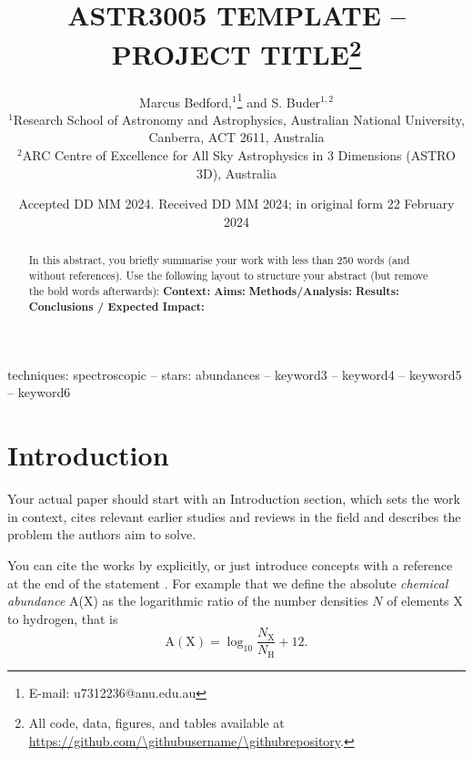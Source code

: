 \documentclass[fleqn,usenatbib]{mnras}
\title[Short title, max. 45 characters]{ASTR3005 TEMPLATE -- PROJECT TITLE\thanks{All code, data, figures, and tables available at \url{https://github.com/\githubusername/\githubrepository}.}}
\author[M. Bedford et al.]{
Marcus Bedford,$^{1}$\thanks{E-mail: u7312236@anu.edu.au}
and S. Buder$^{1,2}$
\\
$^{1}$Research School of Astronomy and Astrophysics, Australian National University, Canberra, ACT 2611, Australia\\
$^{2}$ARC Centre of Excellence for All Sky Astrophysics in 3 Dimensions (ASTRO 3D), Australia
}
\date{Accepted DD MM 2024. Received DD MM 2024; in original form 22 February 2024}
\newcommand{\githubusername}{USERNAME}
\newcommand{\githubrepository}{REPOSITORY}
\begin{document}
\label{firstpage}
\pagerange{\pageref{firstpage}--\pageref{lastpage}}
\maketitle

\begin{abstract}
In this abstract, you briefly summarise your work with less than 250 words (and without references). Use the following layout to structure your abstract (but remove the bold words afterwards): \newline
\textbf{Context:} \newline
\textbf{Aims:} \newline
\textbf{Methods/Analysis:} \newline
\textbf{Results:} \newline
\textbf{Conclusions / Expected Impact:} \newline
\href{https://github.com/\githubusername/\githubrepository}{\faGithub}
\end{abstract}

\begin{keywords}
techniques: spectroscopic -- stars: abundances -- keyword3 -- keyword4 -- keyword5 -- keyword6
\end{keywords}



\section{Introduction}

Your actual paper should start with an Introduction section, which sets the work in context, cites relevant earlier studies and reviews in the field and describes the problem the authors aim to solve.

You can cite the works by \citet{DeSilva2015, Buder2021} explicitly, or just introduce concepts with a reference at the end of the statement \citep[e.g.][]{Buder2021}. For example that we define the absolute \textit{chemical abundance} A(X) as the logarithmic ratio of the number densities $N$ of elements X to hydrogen, that is 
\begin{equation}
\mathrm{A(X)} = \log_{10} \frac{N_\text{X}}{N_\text{H}} + 12.   
\end{equation}
\end{document}
